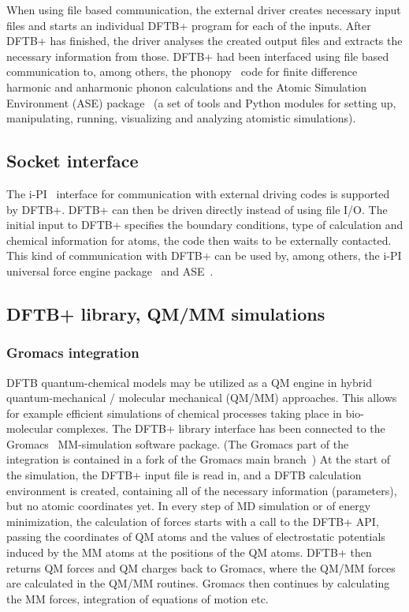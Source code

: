 \documentclass[reprint,onecolumn,superscriptaddress]{revtex4-1}
\newcommand{\dftbp}{DFTB+}
\begin{document}
When using file based communication, the external driver creates necessary input
files and starts an individual \dftbp{} program for each of the
inputs. After \dftbp{} has finished, the driver analyses the created output
files and extracts the necessary information from those. \dftbp{} had been
interfaced using file based communication to, among others, the
phonopy~\cite{phonopy} code for finite difference harmonic and anharmonic phonon
calculations and the Atomic Simulation Environment (ASE)
package~\cite{larsen-jpcm-2017} (a set of tools and Python modules for setting
up, manipulating, running, visualizing and analyzing atomistic simulations).

\subsection{Socket interface}

The i-PI~\cite{ipi} interface for communication with external driving codes is
supported by \dftbp{}. \dftbp{} can then be driven directly instead of
using file I/O. The initial input to \dftbp{} specifies the boundary conditions,
type of calculation and chemical information for atoms, the code then waits to
be externally contacted. This kind of communication with \dftbp{} can be used
by, among others, the i-PI universal force engine package~\cite{ipi} and
ASE~\cite{larsen-jpcm-2017}.


\subsection{\dftbp{} library, QM/MM simulations}

\subsubsection{Gromacs integration}

DFTB quantum-chemical models may be utilized as a QM engine in hybrid
quantum-mechanical / molecular mechanical (QM/MM) approaches.  This allows for
example efficient simulations of chemical processes taking place in bio-molecular
complexes.  The \dftbp{} library interface has been connected to the
Gromacs~\cite{Gromacs7} MM-simulation software package. (The Gromacs part of the
integration is contained in a fork of the Gromacs main
branch~\cite{gromacs-dftbplus-repo}) At the start of the simulation, the \dftbp{}
input file is read in, and a DFTB calculation environment is created, containing
all of the necessary information (parameters), but no atomic coordinates yet.
In every step of MD simulation or of energy minimization, the calculation of
forces starts with a call to the \dftbp{} API, passing the coordinates of QM
atoms and the values of electrostatic potentials induced by the MM atoms at the
positions of the QM atoms.  \dftbp{} then returns QM forces and QM charges back
to Gromacs, where the QM/MM forces are calculated in the QM/MM routines.
Gromacs then continues by calculating the MM forces, integration of equations of
motion etc.
\end{document}
